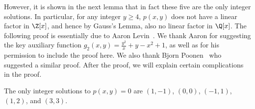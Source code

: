 \documentclass[11pt]{article}
\begin{document}
However, it is shown in the next lemma that in fact these five are the only integer solutions.
In particular, for any integer $y \ge 4$,
$p(x,y)$ does not have a linear factor in $\Z[x]$, and hence by Gauss's Lemma, also no linear factor in $\Q[x]$.
The following proof is essentially due to Aaron Levin~\cite{Lev13}.
We thank Aaron for suggesting the key auxiliary function $g_2(x,y) = \frac{y^2}{x} + y - x^2 + 1$,
as well as for his permission to include the proof here.
We also thank Bjorn Poonen~\cite{Poo13} who suggested a similar proof.
After the proof, we will explain certain complications in the proof.

\begin{lemma} \label{lem:ternary:lattice:no_linear}
 The only integer solutions to $p(x,y) = 0$ are $(1,-1)$, $(0,0)$, $(-1,1)$, $(1,2)$, and $(3,3)$.
\end{lemma}
\end{document}
